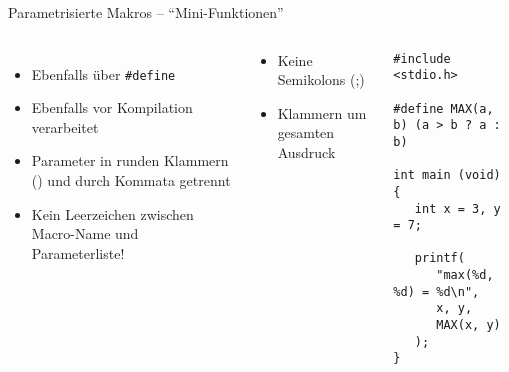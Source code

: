 
\begin{frame}[fragile]{Parametrisierte Makros -- \enquote{Mini-Funktionen}}
%
\begin{columns}[b]
\begin{itemize}
\item Ebenfalls über \texttt{#define}
\item Ebenfalls vor Kompilation verarbeitet
\item Parameter in runden Klammern () und durch Kommata getrennt
\item Kein Leerzeichen zwischen Macro-Name und Parameterliste!
\end{itemize}
%
\begin{hintbox}
\begin{itemize}
\item Keine Semikolons (;)
\item Klammern um gesamten Ausdruck
\end{itemize}
\end{hintbox}
%
\begin{codebox}[Beispiel]
\begin{verbatim}
#include <stdio.h>

#define MAX(a, b) (a > b ? a : b)

int main (void) {
   int x = 3, y = 7;
   
   printf(
      "max(%d, %d) = %d\n", 
      x, y, 
      MAX(x, y)
   );
}
\end{verbatim}
\end{codebox}
\end{columns}
%
\end{frame}


